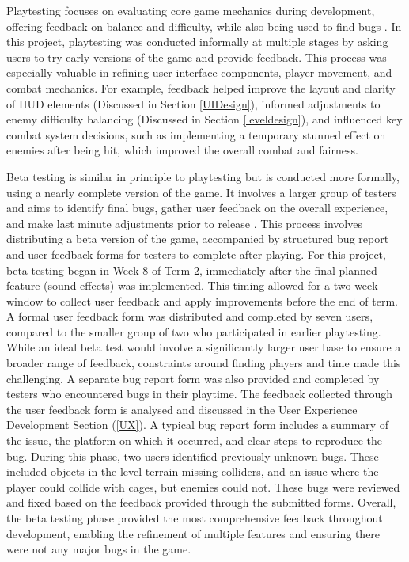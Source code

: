 \documentclass[10pt]{final_report}
\begin{document}
Playtesting focuses on evaluating core game mechanics during development, offering feedback on balance and difficulty, while also being used to find bugs \cite{flashjungle_2022}. In this project, playtesting was conducted informally at multiple stages by asking users to try early versions of the game and provide feedback. This process was especially valuable in refining user interface components, player movement, and combat mechanics. For example, feedback helped improve the layout and clarity of HUD elements (Discussed in  Section \ref{UIDesign}), informed adjustments to enemy difficulty balancing (Discussed in Section \ref{leveldesign}), and influenced key combat system decisions, such as implementing a temporary stunned effect on enemies after being hit, which improved the overall combat and fairness. \newline

Beta testing is similar in principle to playtesting but is conducted more formally, using a nearly complete version of the game. It involves a larger group of testers and aims to identify final bugs, gather user feedback on the overall experience, and make last minute adjustments prior to release \cite{flashjungle_2022}. This process involves distributing a beta version of the game, accompanied by structured bug report and user feedback forms for testers to complete after playing. For this project, beta testing began in Week 8 of Term 2, immediately after the final planned feature (sound effects) was implemented. This timing allowed for a two week window to collect user feedback and apply improvements before the end of term. A formal user feedback form was distributed and completed by seven users, compared to the smaller group of two who participated in earlier playtesting. While an ideal beta test would involve a significantly larger user base to ensure a broader range of feedback, constraints around finding players and time made this challenging. A separate bug report form was also provided and completed by testers who encountered bugs in their playtime. The feedback collected through the user feedback form is analysed and discussed in the User Experience Development Section (\ref{UX}). A typical bug report form includes a summary of the issue, the platform on which it occurred, and clear steps to reproduce the bug. During this phase, two users identified previously unknown bugs. These included objects in the level terrain missing colliders, and an issue where the player could collide with cages, but enemies could not. These bugs were reviewed and fixed based on the feedback provided through the submitted forms. Overall, the beta testing phase provided the most comprehensive feedback throughout development, enabling the refinement of multiple features and ensuring there were not any major bugs in the game. \newline
\end{document}
